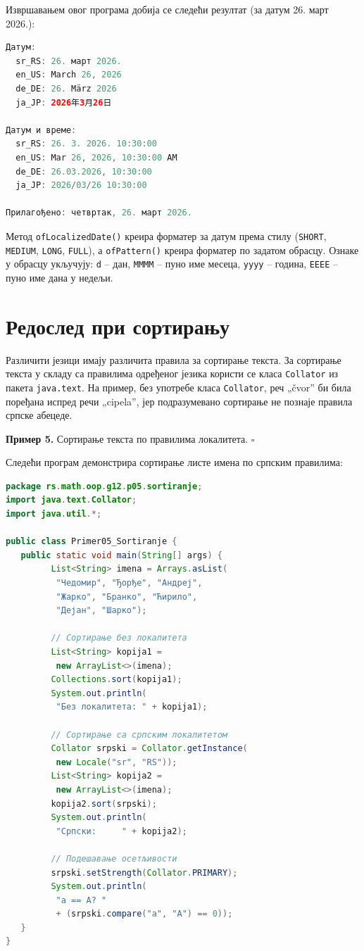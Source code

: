 Извршавањем овог програма добија се следећи резултат (за датум 26. март 2026.):


\begin{lstlisting}[language=Java]
Датум:
  sr_RS: 26. март 2026.
  en_US: March 26, 2026
  de_DE: 26. März 2026
  ja_JP: 2026年3月26日
 
Датум и време:
  sr_RS: 26. 3. 2026. 10:30:00
  en_US: Mar 26, 2026, 10:30:00 AM
  de_DE: 26.03.2026, 10:30:00
  ja_JP: 2026/03/26 10:30:00
 
Прилагођено: четвртак, 26. март 2026.
\end{lstlisting}


Метод \texttt{ofLocalizedDate()} креира форматер за датум према стилу (\texttt{SHORT}, \texttt{MEDIUM}, \texttt{LONG}, \texttt{FULL}), а \texttt{ofPattern()} креира форматер по задатом обрасцу. Ознаке у обрасцу укључују: \texttt{d} – дан, \texttt{MMMM} – пуно име месеца, \texttt{yyyy} – година, \texttt{EEEE} – пуно име дана у недељи.


\section{Редослед при сортирању}

Различити језици имају различита правила за сортирање текста. За сортирање текста у складу са правилима одређеног језика користи се класа \texttt{Collator} из пакета \texttt{java.text}. На пример, без употребе класа \texttt{Collator}, реч „čvor” би била поређана испред речи „cipela”, јер подразумевано сортирање не познаје правила српске абецеде.


\bigskip

\noindent \textbf{Пример 5.} Сортирање текста по правилима локалитета. $\square$

\medskip

Следећи програм демонстрира сортирање листе имена по српским правилима:


\begin{lstlisting}[language=Java]
package rs.math.oop.g12.p05.sortiranje;
import java.text.Collator;
import java.util.*;
 
public class Primer05_Sortiranje {
   public static void main(String[] args) {
         List<String> imena = Arrays.asList(
          "Чедомир", "Ђорђе", "Андреј",
          "Жарко", "Бранко", "Ћирило",
          "Дејан", "Шарко");
 
         // Сортирање без локалитета
         List<String> kopija1 =
          new ArrayList<>(imena);
         Collections.sort(kopija1);
         System.out.println(
          "Без локалитета: " + kopija1);
 
         // Сортирање са српским локалитетом
         Collator srpski = Collator.getInstance(
          new Locale("sr", "RS"));
         List<String> kopija2 =
          new ArrayList<>(imena);
         kopija2.sort(srpski);
         System.out.println(
          "Српски:     " + kopija2);
 
         // Подешавање осетљивости
         srpski.setStrength(Collator.PRIMARY);
         System.out.println(
          "а == А? "
          + (srpski.compare("а", "А") == 0));
   }
}
\end{lstlisting}


